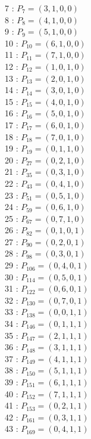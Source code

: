 \documentclass{article}
\begin{document}
{\begin{multicols}{3}
7 : $P_{7}=( 3, 1, 0, 0 )$\\
8 : $P_{8}=( 4, 1, 0, 0 )$\\
9 : $P_{9}=( 5, 1, 0, 0 )$\\
10 : $P_{10}=( 6, 1, 0, 0 )$\\
11 : $P_{11}=( 7, 1, 0, 0 )$\\
12 : $P_{12}=( 1, 0, 1, 0 )$\\
13 : $P_{13}=( 2, 0, 1, 0 )$\\
14 : $P_{14}=( 3, 0, 1, 0 )$\\
15 : $P_{15}=( 4, 0, 1, 0 )$\\
16 : $P_{16}=( 5, 0, 1, 0 )$\\
17 : $P_{17}=( 6, 0, 1, 0 )$\\
18 : $P_{18}=( 7, 0, 1, 0 )$\\
19 : $P_{19}=( 0, 1, 1, 0 )$\\
20 : $P_{27}=( 0, 2, 1, 0 )$\\
21 : $P_{35}=( 0, 3, 1, 0 )$\\
22 : $P_{43}=( 0, 4, 1, 0 )$\\
23 : $P_{51}=( 0, 5, 1, 0 )$\\
24 : $P_{59}=( 0, 6, 1, 0 )$\\
25 : $P_{67}=( 0, 7, 1, 0 )$\\
26 : $P_{82}=( 0, 1, 0, 1 )$\\
27 : $P_{90}=( 0, 2, 0, 1 )$\\
28 : $P_{98}=( 0, 3, 0, 1 )$\\
29 : $P_{106}=( 0, 4, 0, 1 )$\\
30 : $P_{114}=( 0, 5, 0, 1 )$\\
31 : $P_{122}=( 0, 6, 0, 1 )$\\
32 : $P_{130}=( 0, 7, 0, 1 )$\\
33 : $P_{138}=( 0, 0, 1, 1 )$\\
34 : $P_{146}=( 0, 1, 1, 1 )$\\
35 : $P_{147}=( 2, 1, 1, 1 )$\\
36 : $P_{148}=( 3, 1, 1, 1 )$\\
37 : $P_{149}=( 4, 1, 1, 1 )$\\
38 : $P_{150}=( 5, 1, 1, 1 )$\\
39 : $P_{151}=( 6, 1, 1, 1 )$\\
40 : $P_{152}=( 7, 1, 1, 1 )$\\
41 : $P_{153}=( 0, 2, 1, 1 )$\\
42 : $P_{161}=( 0, 3, 1, 1 )$\\
43 : $P_{169}=( 0, 4, 1, 1 )$\\

\end{multicols}}
\end{document}
